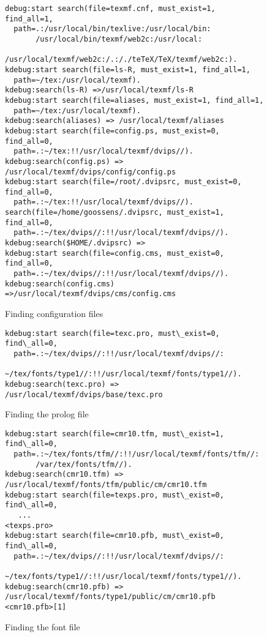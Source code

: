 \begin{figure*}[tp]
\centering
\begin{BVerbatim}[fontsize=\small]
debug:start search(file=texmf.cnf, must_exist=1, find_all=1,
  path=.:/usr/local/bin/texlive:/usr/local/bin:
       /usr/local/bin/texmf/web2c:/usr/local:
       /usr/local/texmf/web2c:/.:/./teTeX/TeX/texmf/web2c:).
kdebug:start search(file=ls-R, must_exist=1, find_all=1,
  path=~/tex:/usr/local/texmf).
kdebug:search(ls-R) =>/usr/local/texmf/ls-R
kdebug:start search(file=aliases, must_exist=1, find_all=1,
  path=~/tex:/usr/local/texmf).
kdebug:search(aliases) => /usr/local/texmf/aliases
kdebug:start search(file=config.ps, must_exist=0, find_all=0,
  path=.:~/tex:!!/usr/local/texmf/dvips//).
kdebug:search(config.ps) => /usr/local/texmf/dvips/config/config.ps
kdebug:start search(file=/root/.dvipsrc, must_exist=0, find_all=0,
  path=.:~/tex:!!/usr/local/texmf/dvips//).
search(file=/home/goossens/.dvipsrc, must_exist=1, find_all=0,
  path=.:~/tex/dvips//:!!/usr/local/texmf/dvips//).
kdebug:search($HOME/.dvipsrc) =>
kdebug:start search(file=config.cms, must_exist=0, find_all=0,
  path=.:~/tex/dvips//:!!/usr/local/texmf/dvips//).
kdebug:search(config.cms)
=>/usr/local/texmf/dvips/cms/config.cms
\end{BVerbatim}
\caption{Finding configuration files}\label{fig:dvipsdbga}

\bigskip

\begin{BVerbatim}[fontsize=\small]
kdebug:start search(file=texc.pro, must\_exist=0, find\_all=0,
  path=.:~/tex/dvips//:!!/usr/local/texmf/dvips//:
       ~/tex/fonts/type1//:!!/usr/local/texmf/fonts/type1//).
kdebug:search(texc.pro) => /usr/local/texmf/dvips/base/texc.pro
\end{BVerbatim}
\caption{Finding the prolog file}\label{fig:dvipsdbgb}

\bigskip

\begin{BVerbatim}[fontsize=\small]
kdebug:start search(file=cmr10.tfm, must\_exist=1, find\_all=0,
  path=.:~/tex/fonts/tfm//:!!/usr/local/texmf/fonts/tfm//:
       /var/tex/fonts/tfm//).
kdebug:search(cmr10.tfm) => /usr/local/texmf/fonts/tfm/public/cm/cmr10.tfm
kdebug:start search(file=texps.pro, must\_exist=0, find\_all=0,
   ...
<texps.pro>
kdebug:start search(file=cmr10.pfb, must\_exist=0, find\_all=0,
  path=.:~/tex/dvips//:!!/usr/local/texmf/dvips//:
       ~/tex/fonts/type1//:!!/usr/local/texmf/fonts/type1//).
kdebug:search(cmr10.pfb) => /usr/local/texmf/fonts/type1/public/cm/cmr10.pfb
<cmr10.pfb>[1]
\end{BVerbatim}
\caption{Finding the font file}\label{fig:dvipsdbgc}
\end{figure*}
